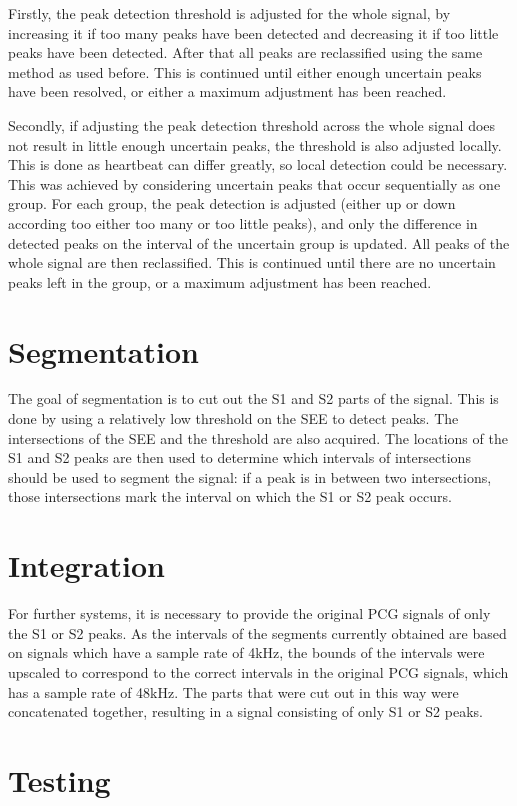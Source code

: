 Firstly, the peak detection threshold is adjusted for the whole signal, by increasing it if too many peaks have been detected and decreasing it if too little peaks have been detected. After that all peaks are reclassified using the same method as used before. This is continued until either enough uncertain peaks have been resolved, or either a maximum adjustment has been reached.

Secondly, if adjusting the peak detection threshold across the whole signal does not result in little enough uncertain peaks, the threshold is also adjusted locally. This is done as heartbeat can differ greatly, so local detection could be necessary. This was achieved by considering uncertain peaks that occur sequentially as one group. For each group, the peak detection is adjusted (either up or down according too either too many or too little peaks), and only the difference in detected peaks on the interval of the uncertain group is updated. All peaks of the whole signal are then reclassified. This is continued until there are no uncertain peaks left in the group, or a maximum adjustment has been reached.


\section{Segmentation}
The goal of segmentation is to cut out the S1 and S2 parts of the signal. This is done by using a relatively low threshold on the SEE to detect peaks. The intersections of the SEE and the threshold are also acquired. The locations of the S1 and S2 peaks are then used to determine which intervals of intersections should be used to segment the signal: if a peak is in between two intersections, those intersections mark the interval on which the S1 or S2 peak occurs. 

\section{Integration}
For further systems, it is necessary to provide the original PCG signals of only the S1 or S2 peaks. As the intervals of the segments currently obtained are based on signals which have a sample rate of 4kHz, the bounds of the intervals were upscaled to correspond to the correct intervals in the original PCG signals, which has a sample rate of 48kHz. The parts that were cut out in this way were concatenated together, resulting in a signal consisting of only S1 or S2 peaks. 


\section{Testing}

